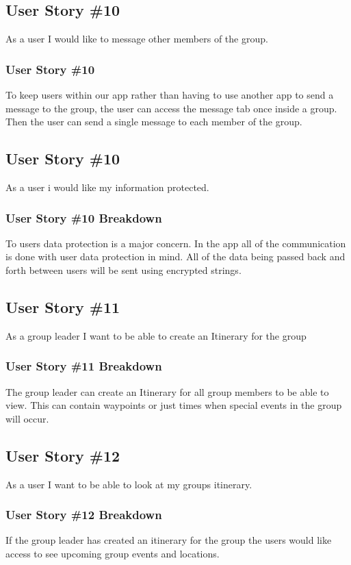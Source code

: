 \subsection{User Story \#10}
As a user I would like to message other members of the group.
\subsubsection{User Story \#10}
To keep users within our app rather than having to use another app to send a message to the group, the user can access the message tab once inside a group.  Then the user can send a single message to each member of the group.

\subsection{User Story \#10} 
As a user i would like my information protected.
\subsubsection{User Story \#10 Breakdown}
To users data protection is a major concern.  In the app all of the communication is done with user data protection in mind.  All of the data being passed back and forth between users will be sent using encrypted strings. 

\subsection{User Story \#11} 
As a group leader I want to be able to create an Itinerary for the group
\subsubsection{User Story \#11 Breakdown}
The group leader can create an Itinerary for all group members to be able to view.  This can contain waypoints or just times when special events in the group will occur.

\subsection{User Story \#12}
As a user I want to be able to look at my groups itinerary.
\subsubsection{User Story \#12 Breakdown}
If the group leader has created an itinerary for the group the users would like access to see upcoming group events and locations.

